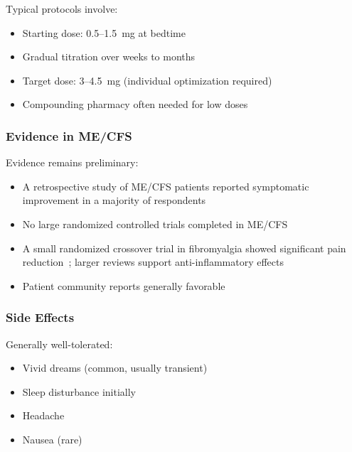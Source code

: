 Typical protocols involve:
\begin{itemize}
    \item Starting dose: 0.5--1.5~mg at bedtime
    \item Gradual titration over weeks to months
    \item Target dose: 3--4.5~mg (individual optimization required)
    \item Compounding pharmacy often needed for low doses
\end{itemize}

\subsubsection{Evidence in ME/CFS}

Evidence remains preliminary:
\begin{itemize}
    \item A retrospective study of ME/CFS patients reported symptomatic improvement in a majority of respondents~\cite{Polo2019}
    \item No large randomized controlled trials completed in ME/CFS
    \item A small randomized crossover trial in fibromyalgia showed significant pain reduction~\cite{Polo2019LDN}; larger reviews support anti-inflammatory effects~\cite{Younger2013}
    \item Patient community reports generally favorable
\end{itemize}

\subsubsection{Side Effects}

Generally well-tolerated:
\begin{itemize}
    \item Vivid dreams (common, usually transient)
    \item Sleep disturbance initially
    \item Headache
    \item Nausea (rare)
\end{itemize}

